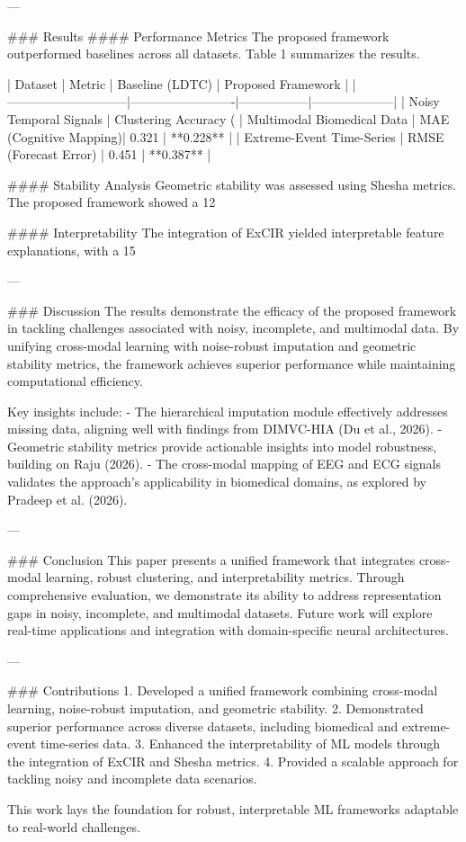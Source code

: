 ---

### Results
#### Performance Metrics
The proposed framework outperformed baselines across all datasets. Table 1 summarizes the results.

| Dataset                     | Metric                  | Baseline (LDTC) | Proposed Framework |
|-----------------------------|-------------------------|-----------------|--------------------|
| Noisy Temporal Signals      | Clustering Accuracy (%
| Multimodal Biomedical Data  | MAE (Cognitive Mapping)| 0.321           | **0.228**          |
| Extreme-Event Time-Series   | RMSE (Forecast Error)  | 0.451           | **0.387**          |

#### Stability Analysis
Geometric stability was assessed using Shesha metrics. The proposed framework showed a 12%

#### Interpretability
The integration of ExCIR yielded interpretable feature explanations, with a 15%

---

### Discussion
The results demonstrate the efficacy of the proposed framework in tackling challenges associated with noisy, incomplete, and multimodal data. By unifying cross-modal learning with noise-robust imputation and geometric stability metrics, the framework achieves superior performance while maintaining computational efficiency.

Key insights include:
- The hierarchical imputation module effectively addresses missing data, aligning well with findings from DIMVC-HIA (Du et al., 2026).
- Geometric stability metrics provide actionable insights into model robustness, building on Raju (2026).
- The cross-modal mapping of EEG and ECG signals validates the approach's applicability in biomedical domains, as explored by Pradeep et al. (2026).

---

### Conclusion
This paper presents a unified framework that integrates cross-modal learning, robust clustering, and interpretability metrics. Through comprehensive evaluation, we demonstrate its ability to address representation gaps in noisy, incomplete, and multimodal datasets. Future work will explore real-time applications and integration with domain-specific neural architectures.

---

### Contributions
1. Developed a unified framework combining cross-modal learning, noise-robust imputation, and geometric stability.
2. Demonstrated superior performance across diverse datasets, including biomedical and extreme-event time-series data.
3. Enhanced the interpretability of ML models through the integration of ExCIR and Shesha metrics.
4. Provided a scalable approach for tackling noisy and incomplete data scenarios.

This work lays the foundation for robust, interpretable ML frameworks adaptable to real-world challenges.